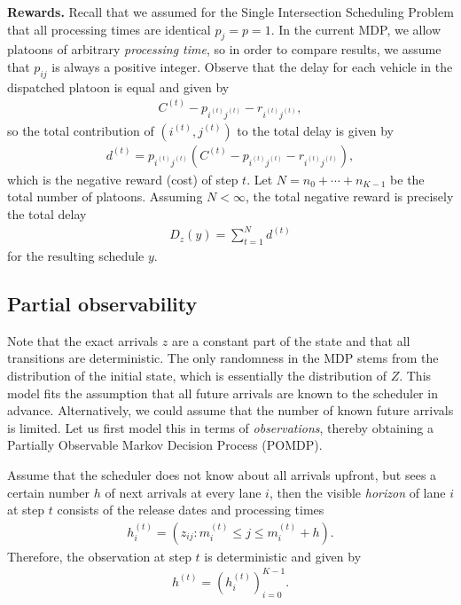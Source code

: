 \documentclass{article}
\theoremstyle{definition}
\theoremstyle{plain}
\begin{document}
\noindent
\textbf{Rewards.} Recall that we assumed for the Single Intersection Scheduling Problem
that all processing times are identical $p_{j} = p = 1$. In the current MDP, we
allow platoons of arbitrary \textit{processing time}, so in order to compare
results, we assume that $p_{ij}$ is always a positive integer.
%
Observe that the delay for each vehicle in the dispatched platoon
is equal and given by
\begin{align}
  C^{(t)} - p_{i^{(t)}j^{(t)}} - r_{i^{(t)}j^{(t)}} ,
\end{align}
so the total contribution of $(i^{(t)},j^{(t)})$ to the total delay is given by
\begin{align}
  d^{(t)} = p_{i^{(t)}j^{(t)}} ( C^{(t)} - p_{i^{(t)}j^{(t)}} - r_{i^{(t)}j^{(t)}}) ,
\end{align}
which is the negative reward (cost) of step $t$. Let $N = n_{0} + \cdots + n_{K-1}$ be
the total number of platoons. Assuming $N < \infty$, the total negative reward is
precisely the total delay
\begin{align}
  D_{z}(y) = \sum_{t=1}^{N} d^{(t)}
\end{align}
for the resulting schedule $y$.

\subsection{Partial observability}

Note that the exact arrivals $z$ are a constant part of the state and that all
transitions are deterministic. The only randomness in the MDP stems from the
distribution of the initial state, which is essentially the distribution of $Z$.
This model fits the assumption that all future arrivals are known to the
scheduler in advance. Alternatively, we could assume that the number of known
future arrivals is limited. Let us first model this in terms of
\textit{observations}, thereby obtaining a Partially Observable Markov Decision
Process (POMDP).

Assume that the scheduler does not know about all arrivals upfront, but sees
a certain number $h$ of next arrivals at every lane $i$, then the
visible \textit{horizon} of lane $i$ at step $t$ consists of the release dates
and processing times
\begin{align}
  \label{eq:observations}
  h_{i}^{(t)} = ( z_{ij} : m_{i}^{(t)} \leq j \leq m_{i}^{(t)} + h ) .
\end{align}
Therefore, the observation at step $t$ is deterministic and given by
\begin{align}
  h^{(t)} = {( h_{i}^{(t)} )}_{i=0}^{K-1} .
\end{align}
\end{document}

